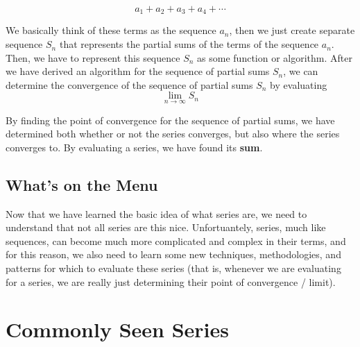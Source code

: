 \documentclass{report}
\begin{document}
\begin{sloppypar}
\[ a_{1} + a_{2} + a_{3} + a_{4} + \cdots \]

We basically think of these terms as the sequence $ a_{n} $, then we just
create separate sequence $ S_{n} $ that represents the partial sums of
the terms of the sequence $ a_{n}$. Then, we have to represent this
sequence $ S_{n} $ as some function or algorithm. After we have
derived an algorithm for the sequence of partial sums $ S_{n} $, we can
determine the convergence of the sequence of partial sums $ S_{n} $ by
evaluating
\[ \lim_{n \rightarrow \infty} S_{n}\]

By finding the point of convergence for the sequence of partial sums,
we have determined both whether or not the series converges, but
also where the series converges to. By evaluating a series, we have
found its \textbf{sum}.

\subsection{What's on the Menu}
Now that we have learned the basic idea of what series are, we need
to understand that not all series are this nice. Unfortuantely,
series, much like sequences, can become much more complicated and complex
in their terms, and for this reason, we also need to learn some new
techniques, methodologies, and patterns for which to evaluate
these series (that is, whenever we are evaluating for a series, we are
really just determining their point of convergence / limit).

\section{Commonly Seen Series}

\end{sloppypar}
\end{document}

